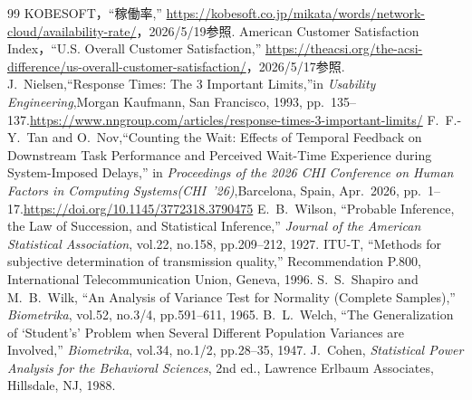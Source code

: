 \begin{thebibliography}{99}
     KOBESOFT，``稼働率,'' \url{https://kobesoft.co.jp/mikata/words/network-cloud/availability-rate/}，2026/5/19参照.
     American Customer Satisfaction Index，``U.S. Overall Customer Satisfaction,'' \url{https://theacsi.org/the-acsi-difference/us-overall-customer-satisfaction/}，2026/5/17参照.
    J.~Nielsen,``Response Times: The 3 Important Limits,''in \textit{Usability Engineering},Morgan Kaufmann, San Francisco, 1993, pp.~135--137.\url{https://www.nngroup.com/articles/response-times-3-important-limits/}
    F.~F.-Y.~Tan and O.~Nov,``Counting the Wait: Effects of Temporal Feedback on Downstream Task Performance and Perceived Wait-Time Experience during System-Imposed Delays,''
    in \textit{Proceedings of the 2026 CHI Conference on Human Factors in Computing Systems(CHI~'26)},Barcelona, Spain, Apr.~2026, pp.~1--17.\url{https://doi.org/10.1145/3772318.3790475}
     E.~B.~Wilson, ``Probable Inference, the Law of Succession, and Statistical Inference,'' \textit{Journal of the American Statistical Association}, vol.22, no.158, pp.209--212, 1927.
     ITU-T, ``Methods for subjective determination of transmission quality,'' Recommendation P.800, International Telecommunication Union, Geneva, 1996.
     S.~S.~Shapiro and M.~B.~Wilk, ``An Analysis of Variance Test for Normality (Complete Samples),'' \textit{Biometrika}, vol.52, no.3/4, pp.591--611, 1965.
     B.~L.~Welch, ``The Generalization of `Student's' Problem when Several Different Population Variances are Involved,'' \textit{Biometrika}, vol.34, no.1/2, pp.28--35, 1947.
     J.~Cohen, \textit{Statistical Power Analysis for the Behavioral Sciences}, 2nd ed., Lawrence Erlbaum Associates, Hillsdale, NJ, 1988.
\end{thebibliography}
